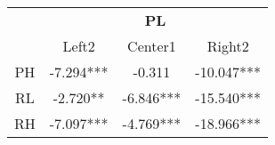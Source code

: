 \begin{table}[]
\begin{tabular}{cccc}
\hline
   & \multicolumn{3}{c}{\textbf{PL}}    \\ \cline{2-4} 
   & Left2     & Center1   & Right2     \\
PH & -7.294*** & -0.311    & -10.047*** \\
RL & -2.720**  & -6.846*** & -15.540*** \\
RH & -7.097*** & -4.769*** & -18.966***
\end{tabular}
\end{table}
